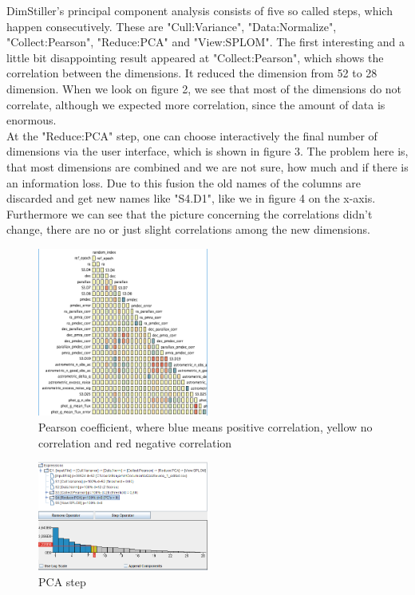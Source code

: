 \documentclass{vgtc}                          %
\begin{document}
DimStiller's principal component analysis consists of five so called steps, which happen consecutively. These are "Cull:Variance", "Data:Normalize", "Collect:Pearson", "Reduce:PCA" and "View:SPLOM". The first interesting and a little bit disappointing result appeared at "Collect:Pearson", which shows the correlation between the dimensions. It reduced the dimension from 52 to 28 dimension. When we look on figure 2, we see that most of the dimensions do not correlate, although we expected more correlation, since the amount of data is enormous.\\
At the "Reduce:PCA" step, one can choose interactively the final number of dimensions via the user interface, which is shown in figure 3. The problem here is, that most dimensions are combined and we are not sure, how much and if there is an information loss. Due to this fusion the old names of the columns are discarded and get new names like "S4.D1", like we in figure 4 on the x-axis. Furthermore we can see that the picture concerning the correlations didn't change, there are no or just slight correlations among the new dimensions.
\begin{figure}[H]
\includegraphics[width=0.5\textwidth]{pearsoncoeff.PNG}
\centering
\caption{Pearson coefficient, where blue means positive correlation, yellow no correlation and red negative correlation}
\end{figure}
\begin{figure}[H]
\includegraphics[width=0.5\textwidth]{pca.PNG}
\centering
\caption{PCA step}
\end{figure}
\end{document}
